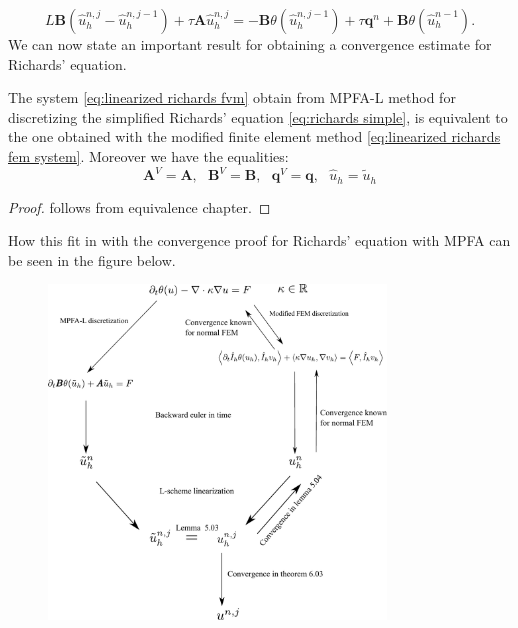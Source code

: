 \documentclass[../Main/main.tex]{subfiles}
\begin{document}
	\begin{equation}\label{eq:linearized richards fem system}
		L\pmb{B}(\hat{u}^{n,j}_h-\hat{u}^{n,j-1}_h) + \tau \pmb{A} \hat{u}_h^{n,j} = -\pmb{B} \theta (\hat{u}_h^{n,j-1})  + \tau \pmb{q}^n +  \pmb{B} \theta (\hat{u}_h^{n-1}).
	\end{equation}
	We can now state an important result for obtaining a convergence estimate for Richards' equation.
	\begin{lemma}
		The system \eqref{eq:linearized richards fvm} obtain from MPFA-L method for discretizing the simplified Richards' equation \eqref{eq:richards simple}, is equivalent to the one obtained with the modified finite element method \eqref{eq:linearized richards fem system}. Moreover we have the equalities: 
		\begin{equation}
			\pmb{A}^V = \pmb{A}, \ \ \ \pmb{B}^V = \pmb{B}, \ \ \ \pmb{q}^V = \pmb{q}, \ \ \ \hat{u}_h = \tilde{u}_h
		\end{equation}
		\begin{proof}
			follows from equivalence chapter.
		\end{proof}
	\end{lemma}
	How this fit in with the convergence proof for Richards' equation with MPFA can be seen in the figure below.
	\begin{figure}[H]
		\centering
		\includegraphics[width=0.8\textwidth]{homogenous_sumary.pdf}
	\end{figure}
	
\end{document}
